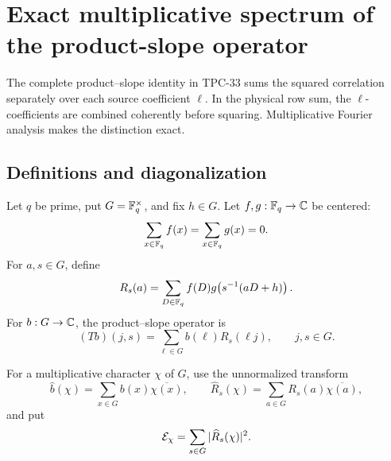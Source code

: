\section{Exact multiplicative spectrum of the product-slope operator}
\label{sec:tpc35-product-spectrum}

The complete product--slope identity in TPC-33 sums the squared
correlation separately over each source coefficient \(\ell\).  In the
physical row sum, the \(\ell\)-coefficients are combined coherently before
squaring.  Multiplicative Fourier analysis makes the distinction exact.

\subsection{Definitions and diagonalization}

Let \(q\) be prime, put \(G=\mathbb F_q^\times\), and fix
\(h\in G\).  Let \(f,g:\mathbb F_q\to\mathbb C\) be centered:
\begin{equation}
 \sum_{x\in\mathbb F_q}f(x)=\sum_{x\in\mathbb F_q}g(x)=0.
 \label{eq:tpc35-fg-centered}
\end{equation}
For \(a,s\in G\), define
\begin{equation}
 R_s(a)=\sum_{D\in\mathbb F_q}
 f(D)g\!\left(s^{-1}(aD+h)\right).
 \label{eq:tpc35-Rsa}
\end{equation}
For \(b:G\to\mathbb C\), the product--slope operator is
\begin{equation}
 (Tb)(j,s)=\sum_{\ell\in G}b(\ell)R_s(\ell j),
 \qquad j,s\in G.
 \label{eq:tpc35-product-operator}
\end{equation}

For a multiplicative character \(\chi\) of \(G\), use the unnormalized
transform
\begin{equation}
 \widehat b(\chi)=\sum_{x\in G}b(x)\overline{\chi(x)},
 \qquad
 \widehat R_s(\chi)=\sum_{a\in G}R_s(a)\overline{\chi(a)},
 \label{eq:tpc35-multiplicative-transform}
\end{equation}
and put
\begin{equation}
 \mathcal E_\chi=\sum_{s\in G}|\widehat R_s(\chi)|^2.
 \label{eq:tpc35-character-energy}
\end{equation}

